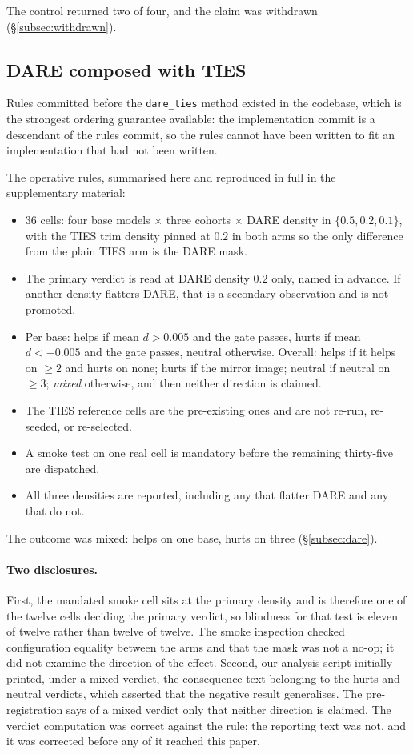 The control returned two of four, and the claim was withdrawn
(\S\ref{subsec:withdrawn}).

\subsection{DARE composed with TIES}

Rules committed before the \texttt{dare\_ties} method existed in the
codebase, which is the strongest ordering guarantee available: the
implementation commit is a descendant of the rules commit, so the rules
cannot have been written to fit an implementation that had not been
written.

The operative rules, summarised here and reproduced in full in the
supplementary material:
\begin{itemize}
\item $36$ cells: four base models $\times$ three cohorts $\times$ DARE
  density in $\{0.5, 0.2, 0.1\}$, with the TIES trim density pinned at
  $0.2$ in both arms so the only difference from the plain TIES arm is
  the DARE mask.
\item The primary verdict is read at DARE density $0.2$ only, named in
  advance. If another density flatters DARE, that is a secondary
  observation and is not promoted.
\item Per base: helps if mean $d > 0.005$ and the gate passes, hurts if
  mean $d < -0.005$ and the gate passes, neutral otherwise. Overall:
  helps if it helps on $\geq 2$ and hurts on none; hurts if the mirror
  image; neutral if neutral on $\geq 3$; \emph{mixed} otherwise, and then
  neither direction is claimed.
\item The TIES reference cells are the pre-existing ones and are not
  re-run, re-seeded, or re-selected.
\item A smoke test on one real cell is mandatory before the remaining
  thirty-five are dispatched.
\item All three densities are reported, including any that flatter DARE
  and any that do not.
\end{itemize}

The outcome was mixed: helps on one base, hurts on three
(\S\ref{subsec:dare}).

\paragraph{Two disclosures.} First, the mandated smoke cell sits at the
primary density and is therefore one of the twelve cells deciding the
primary verdict, so blindness for that test is eleven of twelve rather
than twelve of twelve. The smoke inspection checked configuration
equality between the arms and that the mask was not a no-op; it did not
examine the direction of the effect. Second, our analysis script
initially printed, under a mixed verdict, the consequence text belonging
to the hurts and neutral verdicts, which asserted that the negative
result generalises. The pre-registration says of a mixed verdict only
that neither direction is claimed. The verdict computation was correct
against the rule; the reporting text was not, and it was corrected before
any of it reached this paper.

